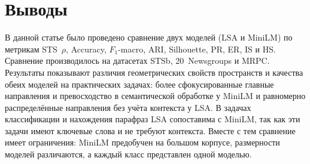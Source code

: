 \section{Выводы}

В данной статье было проведено сравнение двух моделей (LSA и MiniLM)
по метрикам STS~$\rho$, Accuracy, $F_1$-macro, ARI, Silhouette, PR, ER,
IS и HS. Сравнение производилось на датасетах STSb, 20~Newsgroups и MRPC.
Результаты показывают различия геометрических свойств пространств
и качества обеих моделей на практических задачах: более
сфокусированные главные направления и превосходство в семантической
обработке у MiniLM и равномерно распределённые направления без учёта
контекста у LSA. В задачах классификации и нахождения парафраз LSA
сопоставима с MiniLM, так как эти задачи имеют ключевые слова и не
требуют контекста. Вместе с тем сравнение имеет ограничения: MiniLM
предобучен на большом корпусе, размерности моделей различаются, а
каждый класс представлен одной моделью.
